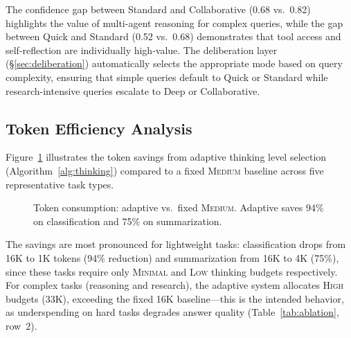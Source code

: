 \documentclass{article}
\theoremstyle{plain}
\theoremstyle{definition}
\begin{document}
The confidence gap between Standard and Collaborative (0.68 vs.\ 0.82)
highlights the value of multi-agent reasoning for complex queries, while the
gap between Quick and Standard (0.52 vs.\ 0.68) demonstrates that tool access
and self-reflection are individually high-value.  The deliberation layer
(\S\ref{sec:deliberation}) automatically selects the appropriate mode based on
query complexity, ensuring that simple queries default to Quick or Standard
while research-intensive queries escalate to Deep or Collaborative.

\subsection{Token Efficiency Analysis}

Figure~\ref{fig:thinking_efficiency} illustrates the token savings from adaptive
thinking level selection (Algorithm~\ref{alg:thinking}) compared to a fixed
\textsc{Medium} baseline across five representative task types.

\begin{figure}[t]
\centering
{}
\caption{Token consumption: adaptive vs.\ fixed \textsc{Medium}.
Adaptive saves 94\% on classification and 75\% on summarization.}
\label{fig:thinking_efficiency}
\end{figure}

The savings are most pronounced for lightweight tasks: classification drops from
16K to 1K tokens (94\% reduction) and summarization from 16K to 4K (75\%),
since these tasks require only \textsc{Minimal} and \textsc{Low} thinking
budgets respectively.  For complex tasks (reasoning and research), the adaptive
system allocates \textsc{High} budgets (33K), exceeding the fixed 16K
baseline---this is the intended behavior, as underspending on hard tasks
degrades answer quality (Table~\ref{tab:ablation}, row~2).
\end{document}
